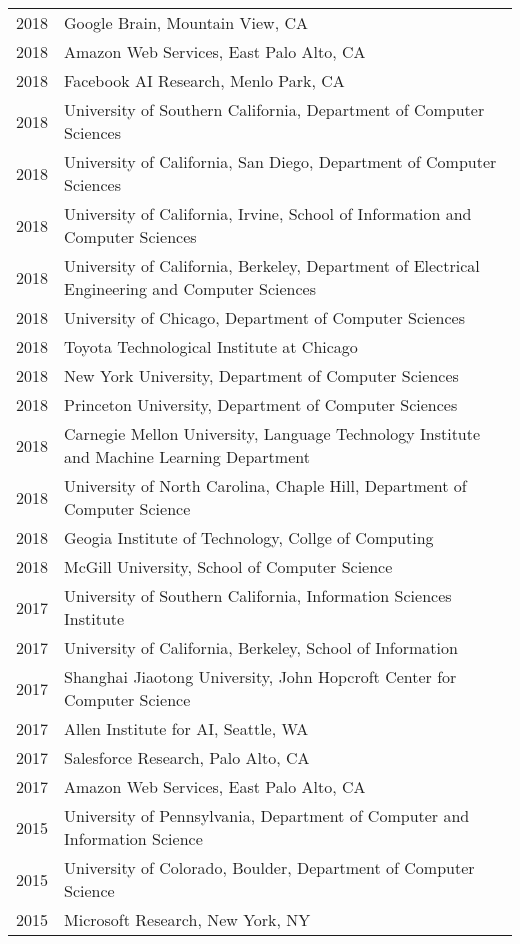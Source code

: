 \documentclass[a4paper,11pt]{article}
\begin{document}
\begin{longtable}{rl}
    2018 & Google Brain, Mountain View, CA \\
    2018 & Amazon Web Services, East Palo Alto, CA \\
    2018 & Facebook AI Research, Menlo Park, CA \\
    2018 & University of Southern California, Department of Computer Sciences \\
    2018 & University of California, San Diego, Department of Computer Sciences \\
    2018 & University of California, Irvine, School of Information and Computer Sciences \\
    2018 & University of California, Berkeley, Department of Electrical Engineering and Computer Sciences \\
    2018 & University of Chicago, Department of Computer Sciences \\
    2018 & Toyota Technological Institute at Chicago \\
    2018 & New York University, Department of Computer Sciences \\
    2018 & Princeton University, Department of Computer Sciences \\
    2018 & Carnegie Mellon University, Language Technology Institute and Machine Learning Department \\
    2018 & University of North Carolina, Chaple Hill, Department of Computer Science \\
    2018 & Geogia Institute of Technology, Collge of Computing \\
    2018 & McGill University, School of Computer Science \\
    2017 & University of Southern California, Information Sciences Institute \\
    2017 & University of California, Berkeley, School of Information \\
    2017 & Shanghai Jiaotong University, John Hopcroft Center for Computer Science \\
    2017 & Allen Institute for AI, Seattle, WA \\
    2017 & Salesforce Research, Palo Alto, CA \\
    2017 & Amazon Web Services, East Palo Alto, CA \\
    2015 & University of Pennsylvania, Department of Computer and Information Science \\
    2015 & University of Colorado, Boulder, Department of Computer Science \\
    2015 & Microsoft Research, New York, NY \\
\end{longtable}
\end{document}

